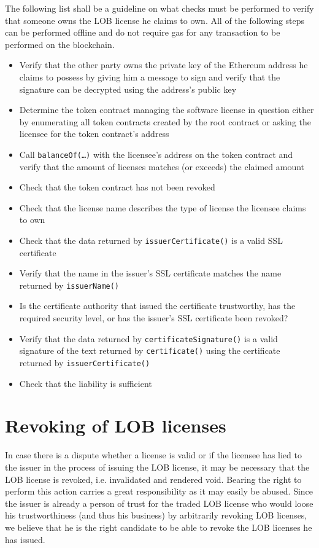\documentclass[a4paper]{article}
\begin{document}
The following list shall be a guideline on what checks must be performed to verify that someone owns the LOB license he claims to own. All of the following steps can be performed offline and do not require gas for any transaction to be performed on the blockchain.

\begin{itemize}
  \item Verify that the other party owns the private key of the Ethereum address he claims to possess by giving him a message to sign and verify that the signature can be decrypted using the address's public key
  \item Determine the token contract managing the software license in question either by enumerating all token contracts created by the root contract or asking the licensee for the token contract's address
  \item Call \texttt{balanceOf(…)} with the licensee's address on the token contract and verify that the amount of licenses matches (or exceeds) the claimed amount
  \item Check that the token contract has not been revoked
  \item Check that the license name describes the type of license the licensee claims to own
  \item Check that the data returned by \texttt{issuerCertificate()} is a valid SSL certificate
  \item Verify that the name in the issuer's SSL certificate matches the name returned by \texttt{issuerName()}
  \item Is the certificate authority that issued the certificate trustworthy, has the required security level, or has the issuer's SSL certificate been revoked?
  \item Verify that the data returned by \texttt{certificateSignature()} is a valid signature of the text returned by \texttt{certificate()} using the certificate returned by \texttt{issuerCertificate()}
  \item Check that the liability is sufficient
\end{itemize}

\section{Revoking of LOB licenses}
\label{ch:revoking}

In case there is a dispute whether a license is valid or if the licensee has lied to the issuer in the process of issuing the LOB license, it may be necessary that the LOB license is revoked, i.e. invalidated and rendered void. Bearing the right to perform this action carries a great responsibility as it may easily be abused. Since the issuer is already a person of trust for the traded LOB license who would loose his trustworthiness (and thus his business) by arbitrarily revoking LOB licenses, we believe that he is the right candidate to be able to revoke the LOB licenses he has issued. 
\end{document}
